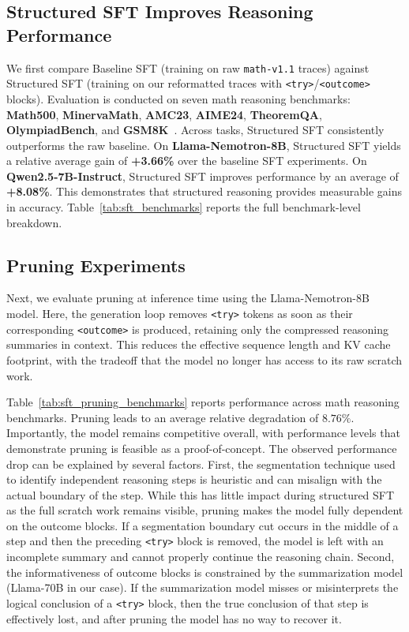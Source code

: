 \documentclass{article}
\begin{document}
\subsection{Structured SFT Improves Reasoning Performance}
We first compare Baseline SFT (training on raw \texttt{math-v1.1} traces) against Structured SFT (training on our reformatted traces with \texttt{<try>}/\texttt{<outcome>} blocks). Evaluation is conducted on seven math reasoning benchmarks: \textbf{Math500}, \textbf{MinervaMath}, \textbf{AMC23}, \textbf{AIME24}, \textbf{TheoremQA}, \textbf{OlympiadBench}, and \textbf{GSM8K}~\citep{hendrycks2021measuring, lewkowycz2022solving,AMC, AIME24,chen2023theoremqa, he2024olympiadbench, cobbe2021training}. Across tasks, Structured SFT consistently outperforms the raw baseline. On \textbf{Llama-Nemotron-8B}, Structured SFT yields a relative average gain of \textbf{+3.66\%} over the baseline SFT experiments. On \textbf{Qwen2.5-7B-Instruct}, Structured SFT improves performance by an average of \textbf{+8.08\%}. This demonstrates that structured reasoning provides measurable gains in accuracy. Table~\ref{tab:sft_benchmarks} reports the full benchmark-level breakdown.


\subsection{Pruning Experiments}
Next, we evaluate pruning at inference time using the Llama-Nemotron-8B model. Here, the generation loop removes \texttt{<try>} tokens as soon as their corresponding \texttt{<outcome>} is produced, retaining only the compressed reasoning summaries in context. This reduces the effective sequence length and KV cache footprint, with the tradeoff that the model no longer has access to its raw scratch work.

Table~\ref{tab:sft_pruning_benchmarks} reports performance across math reasoning benchmarks. Pruning leads to an average relative degradation of $8.76\%$. Importantly, the model remains competitive overall, with performance levels that demonstrate pruning is feasible as a proof-of-concept.  The observed performance drop can be explained by several factors. First, the segmentation technique used to identify independent reasoning steps is heuristic and can misalign with the actual boundary of the step. While this has little impact during structured SFT as the full scratch work remains visible, pruning makes the model fully dependent on the outcome blocks. If a segmentation boundary cut occurs in the middle of a step and then the preceding \texttt{<try>} block is removed, the model is left with an incomplete summary and cannot properly continue the reasoning chain. Second, the informativeness of outcome blocks is constrained by the summarization model (Llama-70B in our case). If the summarization model misses or misinterprets the logical conclusion of a \texttt{<try>} block, then the true conclusion of that step is effectively lost, and after pruning the model has no way to recover it. 
\end{document}
